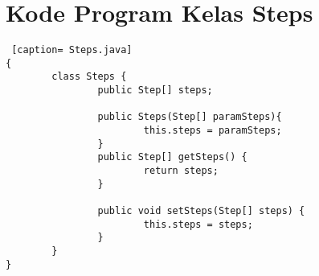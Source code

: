 \chapter{Kode Program Kelas Steps}
\label{Kode Program Kelas Steps}

\begin{lstlisting} [caption= Steps.java]
{ 
		class Steps {
				public Step[] steps;

				public Steps(Step[] paramSteps){
						this.steps = paramSteps;
				}
				public Step[] getSteps() {
						return steps;
				}

				public void setSteps(Step[] steps) {
						this.steps = steps;
				}
		}
}
\end{lstlisting}